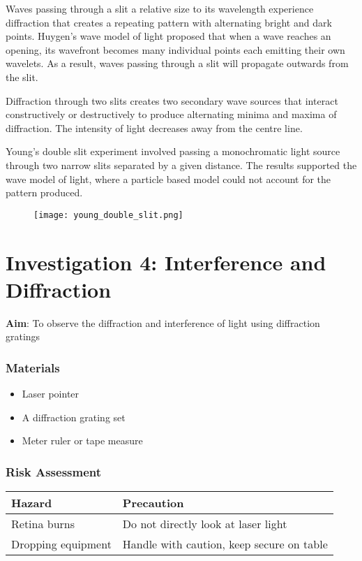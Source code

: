 \documentclass{report}
\begin{document}
			Waves passing through a slit a relative size to its wavelength experience diffraction that creates a repeating pattern with alternating bright and dark points. Huygen's wave model of light proposed that when a wave reaches an opening, its wavefront becomes many individual points each emitting their own wavelets. As a result, waves passing through a slit will propagate outwards from the slit.

			Diffraction through two slits creates two secondary wave sources that interact constructively or destructively to produce alternating minima and maxima of diffraction. The intensity of light decreases away from the centre line.

			Young's double slit experiment involved passing a monochromatic light source through two narrow slits separated by a given distance. The results supported the wave model of light, where a particle based model could not account for the pattern produced.
				
			\begin{figure}[H]
				\centering
				\texttt{[image: young\_double\_slit.png]}
			\end{figure}


\newpage

	\section{Investigation 4: Interference and Diffraction}

		\textbf{Aim}: To observe the diffraction and interference of light using diffraction gratings
		\subsubsection{Materials}

			\begin{itemize}
				\item Laser pointer
				\item A diffraction grating set
				\item Meter ruler or tape measure
			\end{itemize}

		\subsubsection{Risk Assessment}
		
			\begin{table}[H]
				\centering
				\begin{tabular}{p{7cm}|p{7cm}}
					\textbf{Hazard} & \textbf{Precaution} \\ \hline
					Retina burns & Do not directly look at laser light \\
					Dropping equipment & Handle with caution, keep secure on table

				\end{tabular}
			\end{table}
		
\end{document}
